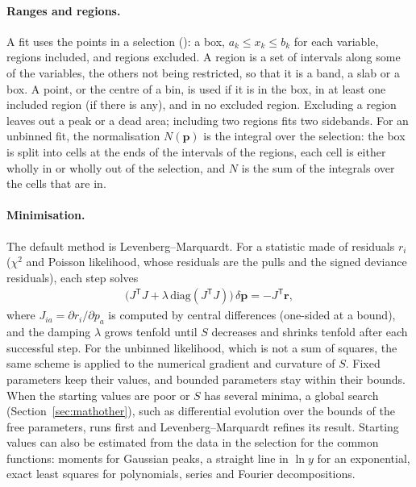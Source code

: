 \paragraph{Ranges and regions.}
A fit uses the points in a selection (): a box, $a_k \le x_k \le b_k$ for each variable, regions
included, and regions excluded. A region is a set of intervals along some of the variables, the others not being
restricted, so that it is a band, a slab or a box. A point, or the centre of a bin, is used if it is in the box, in at
least one included region (if there is any), and in no excluded region. Excluding a region leaves out a peak or a
dead area; including two regions fits two sidebands. For an unbinned fit, the normalisation $N(\mathbf{p})$ is the
integral over the selection: the box is split into cells at the ends of the intervals of the regions, each cell is
either wholly in or wholly out of the selection, and $N$ is the sum of the integrals over the cells that are in.

\paragraph{Minimisation.}
The default method is Levenberg--Marquardt. For a statistic made of residuals $r_i$ ($\chi^2$ and Poisson
likelihood, whose residuals are the pulls and the signed deviance residuals), each step solves
\begin{align}
  \bigl(J^{\mathsf{T}}J + \lambda\,\mathrm{diag}(J^{\mathsf{T}}J)\bigr)\,\delta\mathbf{p} = -J^{\mathsf{T}}\mathbf{r},
\end{align}
where $J_{ia} = \partial r_i/\partial p_a$ is computed by central differences (one-sided at a bound), and the damping
$\lambda$ grows tenfold until $S$ decreases and shrinks tenfold after each successful step. For the unbinned
likelihood, which is not a sum of squares, the same scheme is applied to the numerical gradient and curvature of
$S$. Fixed parameters keep their values, and bounded parameters stay within their bounds. When the starting values
are poor or $S$ has several minima, a global search (Section~\ref{sec:mathother}), such as differential evolution
over the bounds of the free parameters, runs first and Levenberg--Marquardt refines its result. Starting values can
also be estimated from the data in the selection for the common functions: moments for Gaussian peaks, a straight
line in $\ln y$ for an exponential, exact least squares for polynomials, series and Fourier decompositions.

